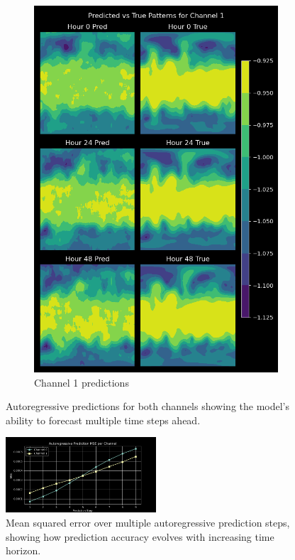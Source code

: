 \documentclass{article}
\begin{document}
\begin{figure}[ht]
\begin{subfigure}[b]{0.4\textwidth}
        \includegraphics[width=\textwidth]{../plots/autoregressive_predictions_channel1_20250321-061452.png}
        \caption{Channel 1 predictions}
    \end{subfigure}
    \caption{Autoregressive predictions for both channels showing the model's ability to forecast multiple time steps ahead.}
    \label{fig:autoregressive_preds}
\end{figure}

\begin{figure}[ht]
    \centering
    \includegraphics[width=0.5\textwidth]{../plots/autoregressive_mse_20250321-061452.png}
    \caption{Mean squared error over multiple autoregressive prediction steps, showing how prediction accuracy evolves with increasing time horizon.}
    \label{fig:autoregressive_mse}
\end{figure}
\end{document}
